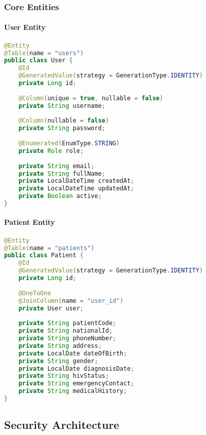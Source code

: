 \documentclass[12pt,a4paper]{article}
\begin{document}
\subsubsection{Core Entities}

\paragraph{User Entity}
\begin{lstlisting}[language=Java, caption=User Entity]
@Entity
@Table(name = "users")
public class User {
    @Id
    @GeneratedValue(strategy = GenerationType.IDENTITY)
    private Long id;
    
    @Column(unique = true, nullable = false)
    private String username;
    
    @Column(nullable = false)
    private String password;
    
    @Enumerated(EnumType.STRING)
    private Role role;
    
    private String email;
    private String fullName;
    private LocalDateTime createdAt;
    private LocalDateTime updatedAt;
    private Boolean active;
}
\end{lstlisting}

\paragraph{Patient Entity}
\begin{lstlisting}[language=Java, caption=Patient Entity]
@Entity
@Table(name = "patients")
public class Patient {
    @Id
    @GeneratedValue(strategy = GenerationType.IDENTITY)
    private Long id;
    
    @OneToOne
    @JoinColumn(name = "user_id")
    private User user;
    
    private String patientCode;
    private String nationalId;
    private String phoneNumber;
    private String address;
    private LocalDate dateOfBirth;
    private String gender;
    private LocalDate diagnosisDate;
    private String hivStatus;
    private String emergencyContact;
    private String medicalHistory;
}
\end{lstlisting}

\subsection{Security Architecture}
\end{document}
